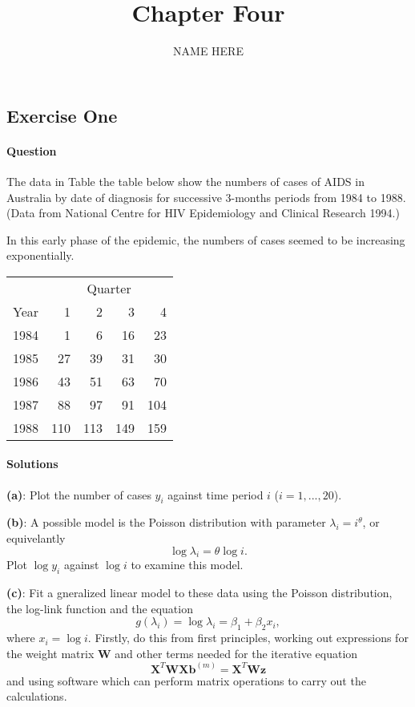 \documentclass[]{article}
\title{Chapter Four}
\author{NAME HERE}
\date{}
\let\oldparagraph\paragraph
\renewcommand{\paragraph}[1]{\oldparagraph{#1}\mbox{}}
\begin{document}
\maketitle

\subsection{Exercise One}\label{exercise-one}

\paragraph{Question}\label{question}

The data in Table the table below show the numbers of cases of AIDS in
Australia by date of diagnosis for successive 3-months periods from 1984
to 1988. (Data from National Centre for HIV Epidemiology and Clinical
Research 1994.)

In this early phase of the epidemic, the numbers of cases seemed to be
increasing exponentially.

\begin{center}
\begin{tabular}{@{}crrrr@{}}
\toprule
     & \multicolumn{4}{c}{Quarter} \\
Year & 1     & 2     & 3    & 4    \\ \midrule
1984 & 1     & 6     & 16   & 23   \\
1985 & 27    & 39    & 31   & 30   \\
1986 & 43    & 51    & 63   & 70   \\
1987 & 88    & 97    & 91   & 104  \\
1988 & 110   & 113   & 149  & 159  \\ \bottomrule
\end{tabular}
\end{center}

\paragraph{Solutions}\label{solutions}

\textbf{(a)}: Plot the number of cases \(y_i\) against time period \(i\)
(\(i = 1,...,20\)).

\textbf{(b)}: A possible model is the Poisson distribution with
parameter \(\lambda_i = i^\theta\), or equivelantly \[
\log\lambda_i = \theta\log i.
\] Plot \(\log y_i\) against \(\log i\) to examine this model.

\textbf{(c)}: Fit a gneralized linear model to these data using the
Poisson distribution, the log-link function and the equation \[
g(\lambda_i) = \log\lambda_i = \beta_1 + \beta_2x_i,
\] where \(x_i = \log i\). Firstly, do this from first principles,
working out expressions for the weight matrix \(\bm{W}\) and other terms
needed for the iterative equation \[
\bm{X}^T\bm{WXb}^{(m)} = \bm{X}^T\bm{Wz}
\] and using software which can perform matrix operations to carry out
the calculations.
\end{document}
